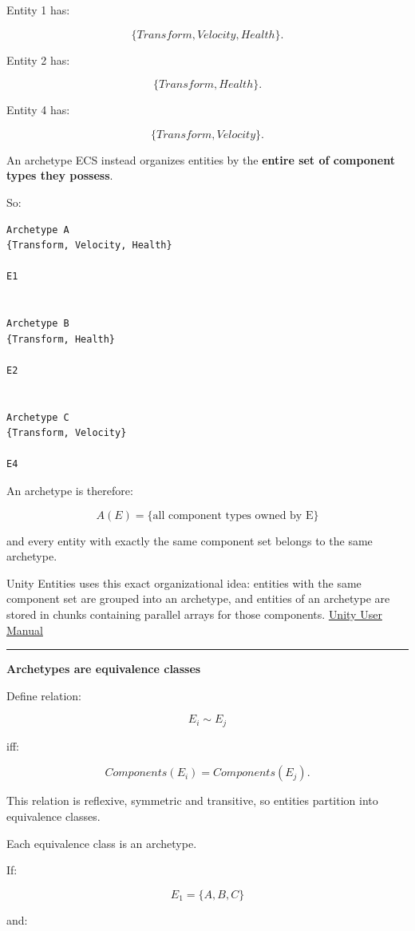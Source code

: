 Entity 1 has:

\[
\{Transform,Velocity,Health\}.
\]

Entity 2 has:

\[
\{Transform,Health\}.
\]

Entity 4 has:

\[
\{Transform,Velocity\}.
\]

An archetype ECS instead organizes entities by the \textbf{entire set of component types they possess}.

So:

\begin{verbatim}
Archetype A
{Transform, Velocity, Health}

E1


Archetype B
{Transform, Health}

E2


Archetype C
{Transform, Velocity}

E4
\end{verbatim}

An archetype is therefore:

\[
\boxed{
A(E)=
\{\text{all component types owned by E}\}
}
\]

and every entity with exactly the same component set belongs to the same archetype.

Unity Entities uses this exact organizational idea: entities with the same component set are grouped into an archetype, and entities of an archetype are stored in chunks containing parallel arrays for those components. \href{https://docs.unity.cn/Packages/com.unity.entities\%401.0/manual/concepts-archetypes.html?utm_source=chatgpt.com}{Unity User Manual}

\begin{center}\rule{0.5\linewidth}{0.5pt}\end{center}

\textbf{Archetypes are equivalence classes}

Define relation:

\[
E_i\sim E_j
\]

iff:

\[
Components(E_i)=Components(E_j).
\]

This relation is reflexive, symmetric and transitive, so entities partition into equivalence classes.

Each equivalence class is an archetype.

If:

\[
E_1=\{A,B,C\}
\]

and:

